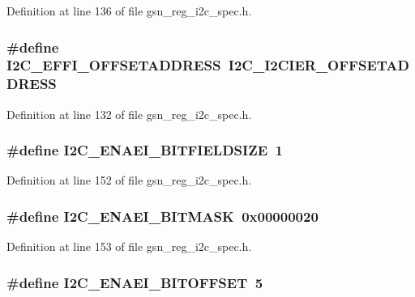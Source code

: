 Definition at line 136 of file gsn\_\-reg\_\-i2c\_\-spec.h.

\hypertarget{a00558_af16c70bd3731b6bc43cedf9e073f8984}{
\subsubsection[{I2C\_\-EFFI\_\-OFFSETADDRESS}]{\setlength{\rightskip}{0pt plus 5cm}\#define I2C\_\-EFFI\_\-OFFSETADDRESS~I2C\_\-I2CIER\_\-OFFSETADDRESS}}
\label{a00558_af16c70bd3731b6bc43cedf9e073f8984}


Definition at line 132 of file gsn\_\-reg\_\-i2c\_\-spec.h.

\hypertarget{a00558_a3d55b163359e649ff9ff5f940227727b}{
\subsubsection[{I2C\_\-ENAEI\_\-BITFIELDSIZE}]{\setlength{\rightskip}{0pt plus 5cm}\#define I2C\_\-ENAEI\_\-BITFIELDSIZE~1}}
\label{a00558_a3d55b163359e649ff9ff5f940227727b}


Definition at line 152 of file gsn\_\-reg\_\-i2c\_\-spec.h.

\hypertarget{a00558_a9fa7ed9a4761a9a6eeabfdfdc6071e4d}{
\subsubsection[{I2C\_\-ENAEI\_\-BITMASK}]{\setlength{\rightskip}{0pt plus 5cm}\#define I2C\_\-ENAEI\_\-BITMASK~0x00000020}}
\label{a00558_a9fa7ed9a4761a9a6eeabfdfdc6071e4d}


Definition at line 153 of file gsn\_\-reg\_\-i2c\_\-spec.h.

\hypertarget{a00558_afda4cbe5bbbb98cdc8306a1b61bfdcd8}{
\subsubsection[{I2C\_\-ENAEI\_\-BITOFFSET}]{\setlength{\rightskip}{0pt plus 5cm}\#define I2C\_\-ENAEI\_\-BITOFFSET~5}}
\label{a00558_afda4cbe5bbbb98cdc8306a1b61bfdcd8}


